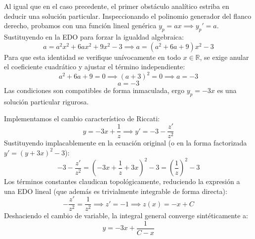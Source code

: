 \documentclass[11pt,a4paper]{article}
\theoremstyle{definition}
\theoremstyle{plain}
\begin{document}
\begin{tcolorbox}
Al igual que en el caso precedente, el primer obstáculo analítico estriba en deducir una solución particular. Inspeccionando el polinomio generador del flanco derecho, probamos con una función lineal genérica $y_p = ax \implies y_p' = a$.
Sustituyendo en la EDO para forzar la igualdad algebraica:
$$ a = a^2 x^2 + 6ax^2 + 9x^2 - 3 \implies a = (a^2 + 6a + 9)x^2 - 3 $$
Para que esta identidad se verifique unívocamente en todo $x \in \mathbb{R}$, se exige anular el coeficiente cuadrático y ajustar el término independiente:
$$ a^2 + 6a + 9 = 0 \implies (a+3)^2 = 0 \implies a = -3 $$
$$ a = -3 $$
Las condiciones son compatibles de forma inmaculada, ergo $y_p = -3x$ es una solución particular rigurosa.

Implementamos el cambio característico de Riccati:
$$ y = -3x + \frac{1}{z} \implies y' = -3 - \frac{z'}{z^2} $$
Sustituyendo implacablemente en la ecuación original (o en la forma factorizada $y' = (y+3x)^2 - 3$):
$$ -3 - \frac{z'}{z^2} = \left( -3x + \frac{1}{z} + 3x \right)^2 - 3 = \left(\frac{1}{z}\right)^2 - 3 $$
Los términos constantes claudican topológicamente, reduciendo la expresión a una EDO lineal (que además es trivialmente integrable de forma directa):
$$ -\frac{z'}{z^2} = \frac{1}{z^2} \implies z' = -1 \implies z(x) = -x + C $$
Deshaciendo el cambio de variable, la integral general converge sintéticamente a:
$$ y = -3x + \frac{1}{C - x} $$

\begin{figure}[H]
    \centering
\end{figure}
\end{tcolorbox}
\end{document}
